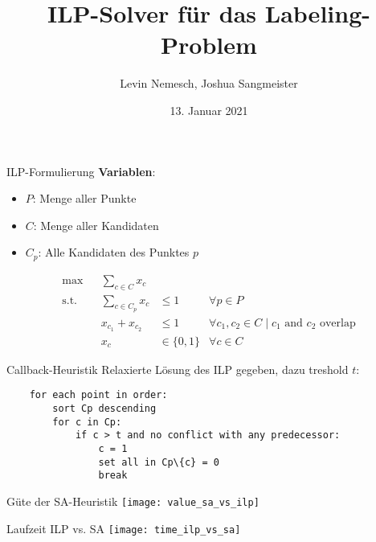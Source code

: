 \documentclass[ngerman,aspectratio=169,10pt]{beamer}
\title{ILP-Solver für das Labeling-Problem}
\date{13. Januar 2021}
\author{Levin Nemesch, Joshua Sangmeister}
\institute{Algorithm Engineering - Projekt}
\begin{document}
\maketitle

\begin{frame}{ILP-Formulierung}
	\textbf{Variablen}:
    \begin{itemize}
        \item $P$: Menge aller Punkte
        \item $C$: Menge aller Kandidaten
        \item $C_p$: Alle Kandidaten des Punktes $p$
    \end{itemize}

	\begin{align*}
	\max && \sum_{c\in C}x_c&&\\
	\text{s.t.} && \sum_{c\in C_p}x_c &\leq 1 &\forall p\in P\\
	&& x_{c_1} + x_{c_2} &\leq 1 &\forall c_1, c_2\in C \mid \text{$c_1$ and $c_2$ overlap}\\
	&& x_c &\in\{0,1\} &\forall c\in C
	\end{align*}
\end{frame}

\begin{frame}[fragile]{Callback-Heuristik}
    Relaxierte Lösung des ILP gegeben, dazu treshold $t$:
    \begin{verbatim}
    for each point in order:
        sort Cp descending
        for c in Cp:
            if c > t and no conflict with any predecessor:
                c = 1
                set all in Cp\{c} = 0
                break
    \end{verbatim}
\end{frame}

\begin{frame}{Güte der SA-Heuristik}
    \centering
    \texttt{[image: value\_sa\_vs\_ilp]}
\end{frame}

\begin{frame}{Laufzeit ILP vs. SA}
    \centering
    \texttt{[image: time\_ilp\_vs\_sa]}
\end{frame}
\end{document}
